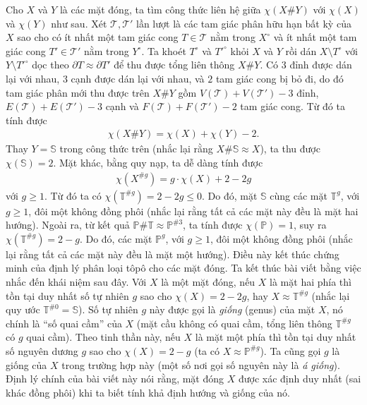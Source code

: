 \begin{multicols}{2}
	\vskip 0.1cm
	Cho $X$ và $Y$ là các mặt đóng, ta tìm công thức liên hệ giữa $\chi(X \# Y)$ với $\chi(X)$ và $\chi(Y)$ như sau. Xét $\mathscr{T},\mathscr{T}'$ lần lượt là các tam giác phân hữu hạn bất kỳ của $X$ sao cho có ít nhất một tam giác cong $T \in \mathscr{T}$ nằm trong $X^\circ$ và ít nhất một tam giác cong $T' \in \mathscr{T}'$ nằm trong $Y^\circ$. Ta khoét $T^{\circ}$ và $T'^{\circ}$ khỏi $X$ và $Y$ rồi dán $X \setminus T^\circ$ với $Y \setminus T'^{\circ}$ dọc theo $\partial T \approx \partial T'$ để thu được tổng liên thông $X \# Y$. Có $3$ đỉnh được dán lại với nhau, $3$ cạnh được dán lại với nhau, và $2$ tam giác cong bị bỏ đi, do đó tam giác phân mới thu được trên $X\#Y$ gồm $V(\mathscr{T}) + V(\mathscr{T}') - 3$ đỉnh, $E(\mathscr{T}) + E(\mathscr{T}') - 3$ cạnh và $F(\mathscr{T}) + F(\mathscr{T}') - 2$ tam giác cong. Từ đó ta tính được
	\begin{align*}
		\chi(X \# Y) = \chi(X) + \chi(Y) - 2.
	\end{align*}
	Thay $Y = \mathbb{S}$ trong công thức trên (nhắc lại rằng $X \# \mathbb{S} \approx X$), ta thu được $\chi(\mathbb{S}) = 2$. Mặt khác, bằng quy nạp, ta dễ dàng tính được
	\begin{align*}
		\chi(X^{\# g}) = g \cdot \chi(X) + 2 - 2g
	\end{align*}
	với $g \ge 1$. Từ đó ta có $\chi(\mathbb{T}^{\# g}) = 2-2g \le 0$. Do đó, mặt $\mathbb{S}$ cùng các mặt $\mathbb{T}^g$, với $g \ge 1$, đôi một không đồng phôi (nhắc lại rằng tất cả các mặt này đều là mặt hai hướng).
	\vskip 0.1cm
	Ngoài ra, từ kết quả $\mathbb{P} \# \mathbb{T} \approx \mathbb{P}^{\# 3}$, ta tính được $\chi(\mathbb{P}) = 1$, suy ra $\chi(\mathbb{T}^{\# g}) = 2-g$. Do đó, các mặt $\mathbb{P}^g$, với $g \ge 1$, đôi một không đồng phôi (nhắc lại rằng tất cả các mặt này đều là mặt một hướng). Điều này kết thúc chứng minh của định lý phân loại tôpô cho các mặt đóng.
	\vskip 0.1cm
	Ta kết thúc bài viết bằng việc nhắc đến khái niệm sau đây. Với $X$ là một mặt đóng, nếu $X$ là mặt hai phía thì tồn tại duy nhất số tự nhiên $g$ sao cho $\chi(X) = 2-2g$, hay $X \approx \mathbb{T}^{\#g}$ (nhắc lại quy ước $\mathbb{T}^{\# 0} = \mathbb{S}$). Số tự nhiên $g$ này được gọi là {\it giống} (genus) của mặt $X$, nó chính là ``số quai cầm'' của $X$ (mặt cầu không có quai cầm, tổng liên thông $\mathbb{T}^{\# g}$ có $g$ quai cầm). Theo tinh thần này, nếu $X$ là mặt một phía thì tồn tại duy nhất số nguyên dương $g$ sao cho $\chi(X) = 2-g$ (ta có $X \approx \mathbb{P}^{\# g}$). Ta cũng gọi $g$ là giống của $X$ trong trường hợp này (một số nơi gọi số nguyên này là {\it á giống}). Định lý chính của bài viết này nói rằng, mặt đóng $X$ được xác định duy nhất (sai khác đồng phôi) khi ta biết tính khả định hướng và giống của nó.
\end{multicols}